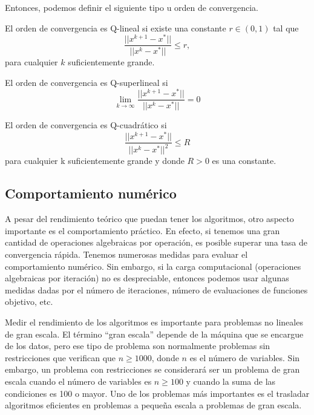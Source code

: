 Entonces, podemos definir el siguiente tipo u orden de convergencia.

\begin{definicion}
El orden de convergencia es Q-lineal si existe una constante $r\in (0,1)$ tal que
\begin{equation*}
\dfrac{||x^{k+1}-x^*||}{||x^k-x^*||} \leq r,
\end{equation*}
para cualquier $k$ suficientemente grande.
\end{definicion}

\begin{definicion}
El orden de convergencia es Q-superlineal si
\begin{equation*}
\lim_{k\xrightarrow{}{}\infty}\dfrac{||x^{k+1}-x^*||}{||x^k-x^*||} = 0
\end{equation*}
\end{definicion}

\begin{definicion}
El orden de convergencia es Q-cuadrático si
\begin{equation*}
\dfrac{||x^{k+1}-x^*||}{||x^k-x^*||^2} \leq R
\end{equation*}
para cualquier k suficientemente grande y donde $R>0$ es una constante.
\end{definicion}

\subsection{Comportamiento numérico}

A pesar del rendimiento teórico que puedan tener los algoritmos, otro aspecto importante es el comportamiento práctico. 
En efecto, si tenemos una gran cantidad de operaciones algebraicas por operación, es posible superar una tasa de convergencia rápida. 
Tenemos numerosas medidas para evaluar el comportamiento numérico. 
Sin embargo, si la carga computacional (operaciones algebraicas por iteración) no es despreciable, entonces podemos usar algunas medidas dadas por el número de iteraciones, número de evaluaciones de funciones objetivo, etc.

Medir el rendimiento de los algoritmos es importante para problemas no lineales de gran escala. 
El término ``gran escala'' depende de la máquina que se encargue de los datos, pero ese tipo de problema son normalmente problemas sin restricciones que verifican que $n\geq 1000$, donde $n$ es el número de variables. 
Sin embargo, un problema con restricciones se considerará ser un problema de gran escala cuando el número de variables es $n\geq 100$ y cuando la suma de las condiciones es 100 o mayor. 
Uno de los problemas más importantes es el trasladar algoritmos eficientes en problemas a pequeña escala a problemas de gran escala.

